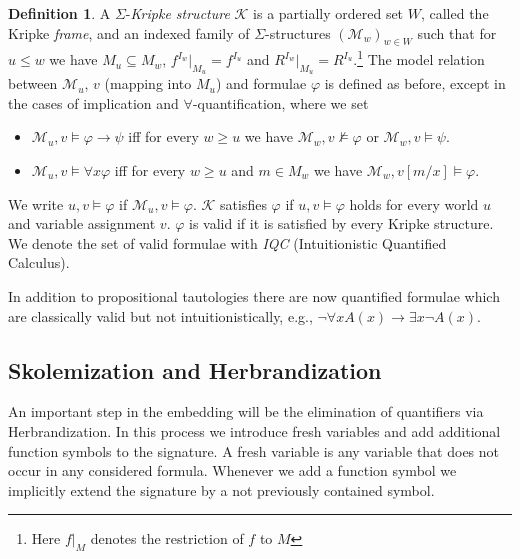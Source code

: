 \documentclass{easychair}
\theoremstyle{definition}
\theoremstyle{definition}
\theoremstyle{definition}
\theoremstyle{definition}
\theoremstyle{definition}
\newtheorem{definition}[theorem]{Definition}
\theoremstyle{definition}
\theoremstyle{definition}
\begin{document}
\begin{definition}
	A $\Sigma$-\emph{Kripke structure} $\mathcal{K}$ is a partially ordered set $W$, called the Kripke \emph{frame}, and an indexed family of $\Sigma$-structures $(\mathcal{M}_w)_{w\in W}$ such that for $u\leq w$ we have $M_u\subseteq M_w$, $f^{I_w}|_{M_u} = f^{I_u}$ and $R^{I_w}|_{M_u} = R^{I_u}$.\footnote{Here $f|_M$ denotes the restriction of $f$ to $M$}
	The model relation between $\mathcal M_u$, $v$ (mapping into $M_u$) and formulae $\varphi$ is defined as before, except in the cases of implication and $\forall$-quantification, where we set
	\begin{itemize}
		\item $\mathcal M_u, v\models \varphi\to\psi$ iff for every $w\geq u$ we have $\mathcal M_w, v\not\models\varphi$ or $\mathcal M_w, v\models\psi$.
		\item $\mathcal M_u, v\models\forall x\varphi$ iff for every $w\geq u$ and $m\in M_w$ we have $\mathcal M_w, v[m/x]\models\varphi$.
	\end{itemize}
	We write $u, v\models\varphi$ if $\mathcal M_u, v\models \varphi$. $\mathcal{K}$ satisfies $\varphi$ if $u, v\models\varphi$ holds for every world $u$ and variable assignment $v$. $\varphi$ is valid if it is satisfied by every Kripke structure.
	We denote the set of valid formulae with \emph{IQC} (Intuitionistic Quantified Calculus).
\end{definition}
In addition to propositional tautologies there are now quantified formulae which are classically valid but not intuitionistically, e.g., $\neg\forall x A(x)\to \exists x \neg A(x)$.

\subsection{Skolemization and Herbrandization}\label{section:herbrandiaztion}

An important step in the embedding will be the elimination of quantifiers via Herbrandization.
In this process we introduce fresh variables and add additional function symbols to the signature.
A fresh variable is any variable that does not occur in any considered formula.
Whenever we add a function symbol we implicitly extend the signature by a not previously contained symbol.
\end{document}
